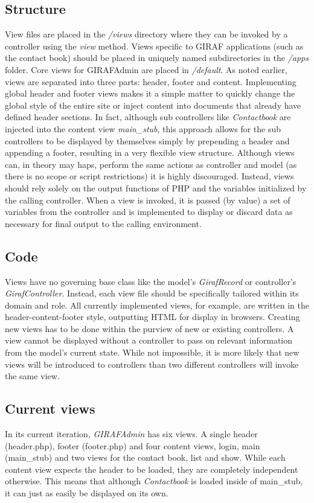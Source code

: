 \subsection{Structure}
View files are placed in the \emph{/views} directory where they can be invoked by a controller using the \emph{view} method. Views specific to GIRAF applications (such as the contact book) should be placed in uniquely named subdirectories in the \emph{/apps} folder. Core views for GIRAFAdmin are placed in \emph{/default}.
As noted earlier, views are separated into three parts: header, footer and content. Implementing global header and footer views makes it a simple matter to quickly change the global style of the entire site or inject content into documents that already have defined header sections. In fact, although sub controllers like \emph{Contactbook} are injected into the content view \emph{main\_stub}, this approach allows for the sub controllers to be displayed by themselves simply by prepending a header and appending a footer, resulting in a very flexible view structure.
Although views can, in theory may haps, perform the same actions as controller and model (as there is no scope or script restrictions) it is highly discouraged. Instead, views should rely solely on the output functions of PHP and the variables initialized by the calling controller. When a view is invoked, it is passed (by value) a set of variables from the controller and is implemented to display or discard data as necessary for final output to the calling environment.

\subsection{Code}
Views have no governing base class like the model's \emph{GirafRecord} or controller's \emph{GirafController}. Instead, each view file should be specifically tailored within its domain and role. All currently implemented views, for example, are written in the header-content-footer style, outputting HTML for display in browsers.
Creating new views has to be done within the purview of new or existing controllers. A view cannot be displayed without a controller to pass on relevant information from the model's current state. While not impossible, it is more likely that new views will be introduced to controllers than two different controllers will invoke the same view.

\subsection{Current views}
In its current iteration, \emph{GIRAFAdmin} has six views. A single header (header.php), footer (footer.php) and four content views, login, main (main\_stub) and two views for the contact book, list and show. While each content view expects the header to be loaded, they are completely independent otherwise. This means that although \emph{Contactbook} is loaded inside of main\_stub, it can just as easily be displayed on its own.
